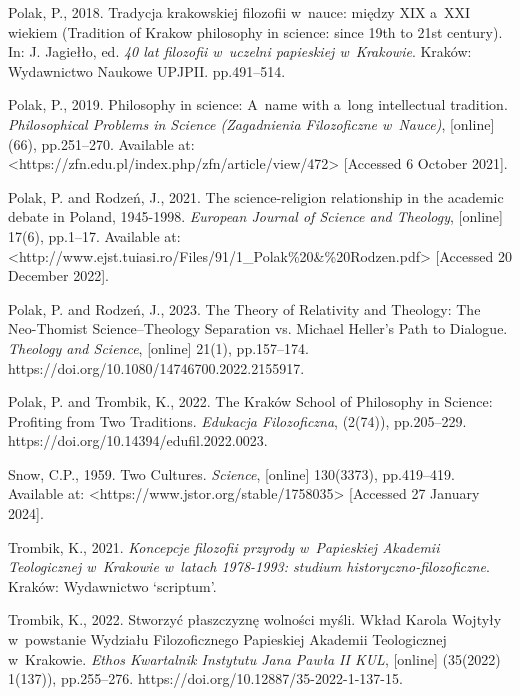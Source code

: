 Polak, P., 2018. Tradycja krakowskiej filozofii w~nauce: między XIX a~XXI wiekiem (Tradition of Krakow philosophy in science: since 19th to 21st century). In: J. Jagiełło, ed. \textit{40 lat filozofii w~uczelni papieskiej w~Krakowie}. Kraków: Wydawnictwo Naukowe UPJPII. pp.491–514.



Polak, P., 2019. Philosophy in science: A~name with a~long intellectual tradition. \textit{Philosophical Problems in Science (Zagadnienia Filozoficzne w~Nauce)}, [online] (66), pp.251–270. Available at: {\textless}https://zfn.edu.pl/index.php/zfn/article/view/472{\textgreater} [Accessed 6 October 2021].



Polak, P. and Rodzeń, J., 2021. The science-religion relationship in the academic debate in Poland, 1945-1998. \textit{European Journal of Science and Theology}, [online] 17(6), pp.1–17. Available at: {\textless}http://www.ejst.tuiasi.ro/Files/91/1\_Polak\%20\&\%20Rodzen.pdf{\textgreater} [Accessed 20 December 2022].



Polak, P. and Rodzeń, J., 2023. The Theory of Relativity and Theology: The Neo-Thomist Science–Theology Separation vs. Michael Heller's Path to Dialogue. \textit{Theology and Science}, [online] 21(1), pp.157–174. https://doi.org/10.1080/14746700.2022.2155917.



Polak, P. and Trombik, K., 2022. The Kraków School of Philosophy in Science: Profiting from Two Traditions. \textit{Edukacja Filozoficzna}, (2(74)), pp.205–229. https://doi.org/10.14394/edufil.2022.0023.



Snow, C.P., 1959. Two Cultures. \textit{Science}, [online] 130(3373), pp.419–419. Available at: {\textless}https://www.jstor.org/stable/1758035{\textgreater} [Accessed 27 January 2024].



Trombik, K., 2021. \textit{Koncepcje filozofii przyrody w~Papieskiej Akademii Teologicznej w~Krakowie w~latach 1978-1993: studium historyczno-filozoficzne}. Kraków: Wydawnictwo ‘scriptum'.



Trombik, K., 2022. Stworzyć płaszczyznę wolności myśli. Wkład Karola Wojtyły w~powstanie Wydziału Filozoficznego Papieskiej Akademii Teologicznej w~Krakowie. \textit{Ethos Kwartalnik Instytutu Jana Pawła II KUL}, [online] (35(2022) 1(137)), pp.255–276. https://doi.org/10.12887/35-2022-1-137-15.




